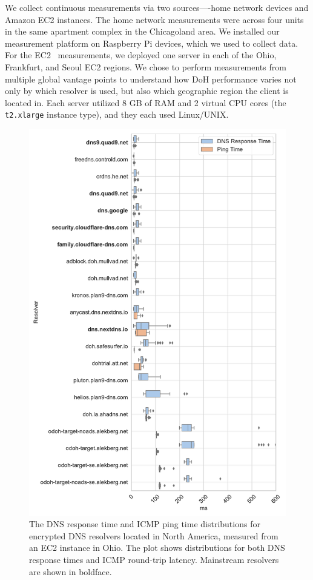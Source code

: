 We collect continuous measurements via two sources—-home network devices and Amazon EC2 instances. The home network measurements were across four units in the same apartment complex in the Chicagoland area. 
We installed our measurement platform on Raspberry Pi devices, which we used to  collect data. 
For the EC2~\cite{amazon_ec2} measurements, we deployed one server
in each of the Ohio, Frankfurt, and Seoul EC2 regions.  We chose to perform
measurements from multiple global vantage points to understand how DoH
performance varies not only by which resolver is used, but also which
geographic region the client is located in.  Each server utilized 8 GB of RAM
and 2 virtual CPU cores (the \texttt{t2.xlarge} instance type), and they each
used Linux/UNIX.

\begin{figure}[t!]
\centering\includegraphics[width=0.8\columnwidth]{figures/ohio_NA.pdf}
\caption{The DNS response time and ICMP ping time distributions for
    encrypted DNS resolvers located in North America, measured from an EC2
    instance in Ohio.  The plot shows distributions for both DNS response times
    and ICMP round-trip latency. Mainstream resolvers are shown in boldface.}
    \label{fig:dns-us-ohio}
\end{figure}

